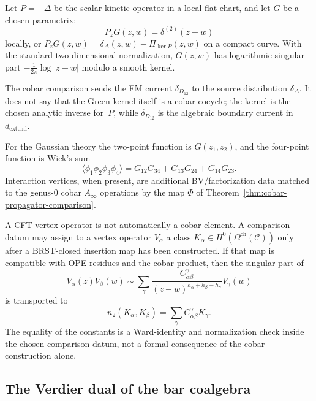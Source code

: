 \begin{example}\label{ex:free-scalar-cobar}
Let $P=-\Delta$ be the scalar kinetic operator in a local flat chart,
and let $G$ be a chosen parametrix:
\[
P_zG(z,w)=\delta^{(2)}(z-w)
\]
locally, or
$P_zG(z,w)=\delta_\Delta(z,w)-\Pi_{\ker P}(z,w)$ on a compact curve.
With the standard two-dimensional normalization,
$G(z,w)$ has logarithmic singular part
$-\frac{1}{2\pi}\log|z-w|$ modulo a smooth kernel.

The cobar comparison sends the FM current
$\delta_{D_{12}}$ to the source distribution $\delta_\Delta$.
It does not say that the Green kernel itself is a cobar cocycle; the
kernel is the chosen analytic inverse for~$P$, while
$\delta_{D_{12}}$ is the algebraic boundary current in
$d_{\mathrm{extend}}$.

For the Gaussian theory the two-point function is $G(z_1,z_2)$, and
the four-point function is Wick's sum
\[
\langle\phi_1\phi_2\phi_3\phi_4\rangle
=G_{12}G_{34}+G_{13}G_{24}+G_{14}G_{23}.
\]
Interaction vertices, when present, are additional BV/factorization
data matched to the genus-$0$ cobar $A_\infty$ operations by the map
$\Phi$ of Theorem~\ref{thm:cobar-propagator-comparison}.
\end{example}

\begin{remark}\label{rem:vertex-operators-cobar}
A CFT vertex operator is not automatically a cobar element. A
comparison datum may assign to a vertex operator $V_\alpha$ a class
$K_\alpha\in H^0(\Omega^{\mathrm{ch}}(\mathcal{C}))$ only after a
BRST-closed insertion map has been constructed. If that map is
compatible with OPE residues and the cobar product, then the singular
part of
\[
V_\alpha(z)V_\beta(w)
\sim
\sum_\gamma
\frac{C_{\alpha\beta}^{\gamma}}
{(z-w)^{h_\alpha+h_\beta-h_\gamma}}V_\gamma(w)
\]
is transported to
\[
n_2(K_\alpha,K_\beta)
=\sum_\gamma C_{\alpha\beta}^{\gamma}K_\gamma.
\]
The equality of the constants is a Ward-identity and normalization
check inside the chosen comparison datum, not a formal consequence of
the cobar construction alone.
\end{remark}

\subsection{The Verdier dual of the bar coalgebra}

